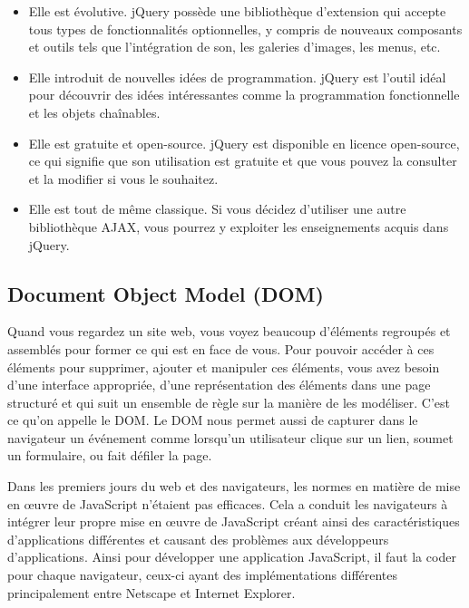 \begin{itemize}
    
    \item[\textbullet]
    Elle est évolutive. jQuery possède une bibliothèque d'extension qui accepte tous types de fonctionnalités optionnelles, y compris de nouveaux composants et outils tels que l'intégration de son, les galeries d'images, les menus, etc.
    
    \item[\textbullet]
    Elle introduit de nouvelles idées de programmation. jQuery est l'outil idéal pour découvrir des idées intéressantes comme la programmation fonctionnelle et les objets chaînables.
    
    \item[\textbullet]
    Elle est gratuite et open-source. jQuery est disponible en licence open-source, ce qui signifie que son utilisation est gratuite et que vous pouvez la consulter et la modifier si vous le souhaitez.
    
    \item[\textbullet]
    Elle est tout de même classique. Si vous décidez d'utiliser une autre bibliothèque AJAX, vous pourrez y exploiter les enseignements acquis dans jQuery.

\end{itemize}

\subsection{Document Object Model (DOM) }

Quand vous regardez un site web, vous voyez beaucoup d'éléments regroupés et assemblés pour former ce qui est en face de vous. Pour pouvoir accéder à ces éléments pour supprimer, ajouter et manipuler ces éléments, vous avez besoin d'une interface appropriée, d'une représentation des éléments dans une page structuré et qui suit un ensemble de règle sur la manière de les modéliser. C'est ce qu'on appelle le DOM. Le DOM nous permet aussi de capturer dans le navigateur un événement comme lorsqu'un utilisateur clique sur un lien, soumet un formulaire, ou fait défiler la page.

Dans les premiers jours du web et des navigateurs, les normes en matière de mise en œuvre de JavaScript n'étaient pas efficaces. Cela a conduit les navigateurs à intégrer leur propre mise en œuvre de JavaScript créant ainsi des caractéristiques d'applications différentes et causant des problèmes aux développeurs d'applications.
Ainsi pour développer une application JavaScript, il faut la coder pour chaque navigateur, ceux-ci ayant des implémentations différentes principalement entre Netscape et Internet Explorer.

